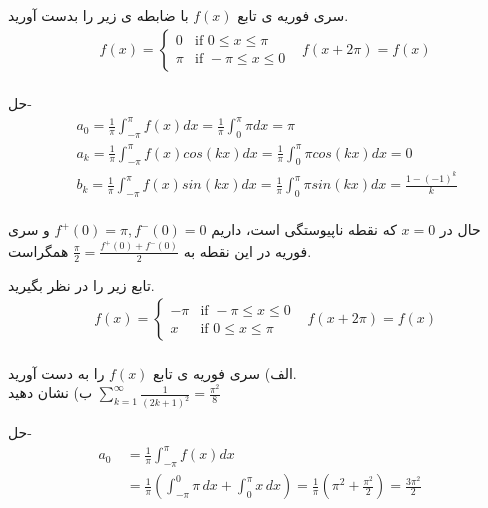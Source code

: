 \hrulefill

\begin{example}
	سری فوریه ی تابع
	$f(x)$
	با ضابطه ی زیر را بدست آورید.
	\begin{align*}
		&f(x)=
		\begin{cases}
			0 &\mbox{if } 0\le x\le \pi
			\\
			\pi &\mbox{if } -\pi\le x \le 0
		\end{cases}
		& f(x+2\pi)=f(x)
	\end{align*}
	\hrulefill
	\\
	حل-
	\begin{equation*}
		\begin{aligned}
			{} &\ a_0=\frac{1}{\pi}\int_{-\pi}^{\pi}{f(x)dx}=\frac{1}{\pi}\int_{0}^{\pi}{\pi dx}=\pi\\
			&\ a_k=\frac{1}{\pi}\int_{-\pi}^{\pi}{f(x)cos(kx)dx}=\frac{1}{\pi}\int_{0}^{\pi}{\pi cos(kx) dx}=0\\
			&\ b_k=\frac{1}{\pi}\int_{-\pi}^{\pi}{f(x)sin(kx)dx}=\frac{1}{\pi}\int_{0}^{\pi}{\pi sin(kx) dx}=\frac{1-(-1)^k}{k}\\
		\end{aligned}
	\end{equation*}
	
\end{example}
\hrulefill
حال در 
$x=0$
که نقطه ناپیوستگی است، داریم
$f^+(0)=\pi , f^-(0)=0$
و  سری فوریه در این نقطه به
$\frac{\pi}{2}=\frac{f^+(0)+f^-(0)}{2}$
همگراست.\\
\begin{example}
	تابع زیر را در نظر بگیرید.
	\begin{align*}
		&f(x)=
		\begin{cases}
			-\pi &\mbox{if } -\pi\le x\le 0
			\\
			x &\mbox{if } 0\le x \le \pi
		\end{cases}
		& f(x+2\pi)=f(x)
	\end{align*}
	\hrulefill
	\\
	الف) سری فوریه ی تابع 
	$f(x)$
	را به دست آورید.\\
	ب) نشان دهید 
	$\sum_{k=1}^{\infty}{\frac{1}{(2k+1)^2}}=\frac{\pi^2}{8}$
\end{example}
حل-
\begin{equation*}
	\begin{aligned}
		a_0 {}
		&\
		=\frac{1}{\pi}\int_{-\pi}^{\pi}{f(x)dx}\\
		&\
		=\frac{1}{\pi}\left(\int_{-\pi}^{0}{\pi \, dx}+\int_{0}^{\pi}{x \, dx}\right)=\frac{1}{\pi}\left(\pi^2+\frac{\pi^2}{2}\right)=\frac{3\pi^2}{2}
	\end{aligned}
\end{equation*}
